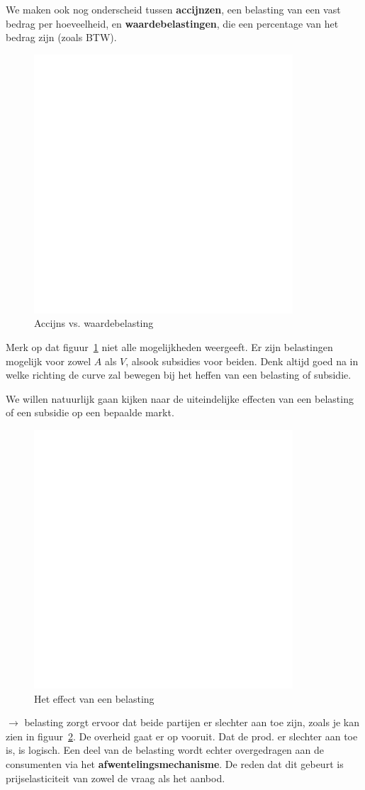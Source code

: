 We maken ook nog onderscheid tussen \textbf{accijnzen}, een belasting van een vast bedrag per hoeveelheid, en \textbf{waardebelastingen}, die een percentage van het bedrag zijn (zoals BTW).

\begin{figure}[htbp]
	\centering
	\includegraphics[scale=0.4]{Images/white.png}
	\caption{Accijns vs. waardebelasting}
	\label{fig:belastingen}
\end{figure}
Merk op dat figuur~\ref{fig:belastingen} niet alle mogelijkheden weergeeft. Er zijn belastingen mogelijk voor zowel $A$ als $V$, alsook subsidies voor beiden. Denk altijd goed na in welke richting de curve zal bewegen bij het heffen van een belasting of subsidie.

We willen natuurlijk gaan kijken naar de uiteindelijke effecten van een belasting of een subsidie op een bepaalde markt.
\begin{figure}[htbp]
	\centering
	\includegraphics[scale=0.4]{Images/white.png}
	\caption{Het effect van een belasting}
	\label{fig:effectVanBelasting}
\end{figure}
$\rightarrow$ belasting zorgt ervoor dat beide partijen er slechter aan toe zijn, zoals je kan zien in figuur~\ref{fig:effectVanBelasting}. De overheid gaat er op vooruit. Dat de prod. er slechter aan toe is, is logisch. Een deel van de belasting wordt echter overgedragen aan de consumenten via het \textbf{afwentelingsmechanisme}. De reden dat dit gebeurt is prijselasticiteit van zowel de vraag als het aanbod.


